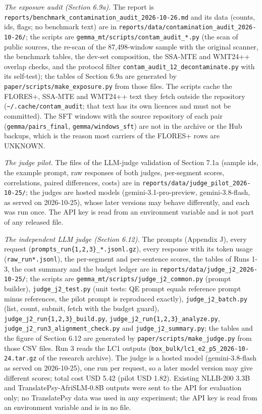 \emph{The exposure audit (Section 6.9a).} The report is \texttt{reports/benchmark\_contamination\_audit\_2026-10-26.md} and its data (counts, ids, flags; no benchmark text) are in \texttt{reports/data/contamination\_audit\_2026-10-26/}; the scripts are \texttt{gemma\_mt/scripts/contam\_audit\_*.py} (the scan of public sources, the re-scan of the 87,498-window sample with the original scanner, the benchmark tables, the dev-set composition, the SSA-MTE and WMT24++ overlap checks, and the protocol filter \texttt{contam\_audit\_12\_decontaminate.py} with its self-test); the tables of Section 6.9a are generated by \texttt{paper/scripts/make\_exposure.py} from those files. The scripts cache the FLORES+, SSA-MTE and WMT24++ text they fetch outside the repository (\texttt{\textasciitilde{}/.cache/contam\_audit}; that text has its own licences and must not be committed). The SFT windows with the source repository of each pair (\texttt{gemma/pairs\_final}, \texttt{gemma/windows\_sft}) are not in the archive or the Hub backups, which is the reason most carriers of the FLORES+ rows are UNKNOWN.

\emph{The judge pilot.} The files of the LLM-judge validation of Section 7.1a (sample ids, the example prompt, raw responses of both judges, per-segment scores, correlations, paired differences, costs) are in \texttt{reports/data/judge\_pilot\_2026-10-25/}; the judges are hosted models (gemini-3.1-pro-preview, gemini-3.8-flash, as served on 2026-10-25), whose later versions may behave differently, and each was run once. The API key is read from an environment variable and is not part of any released file.

\emph{The independent LLM judge (Section 6.12).} The prompts (Appendix J), every request (\texttt{prompts\_run\{1,2,3\}\_*.jsonl.gz}), every response with its token usage (\texttt{raw\_run*.jsonl}), the per-segment and per-sentence scores, the tables of Runs 1-3, the cost summary and the budget ledger are in \texttt{reports/data/judge\_j2\_2026-10-25/}; the scripts are \texttt{gemma\_mt/scripts/judge\_j2\_common.py} (prompt builder), \texttt{judge\_j2\_test.py} (unit tests: QE prompt equals reference prompt minus references, the pilot prompt is reproduced exactly), \texttt{judge\_j2\_batch.py} (list, count, submit, fetch with the budget guard), \texttt{judge\_j2\_run\{1,2,3\}\_build.py}, \texttt{judge\_j2\_run\{1,2,3\}\_analyze.py}, \texttt{judge\_j2\_run3\_alignment\_check.py} and \texttt{judge\_j2\_summary.py}; the tables and the figure of Section 6.12 are generated by \texttt{paper/scripts/make\_judge.py} from those CSV files. Run 3 reads the LC1 outputs (\texttt{box\_bulk/lc1\_e2\_p5\_2026-10-24.tar.gz} of the research archive). The judge is a hosted model (gemini-3.8-flash as served on 2026-10-25), one run per request, so a later model version may give different scores; total cost USD 5.42 (pilot USD 1.82). Existing NLLB-200 3.3B and TranslatePsy-AfriSLM-0.8B outputs were sent to the API for evaluation only; no TranslatePsy data was used in any experiment; the API key is read from an environment variable and is in no file.

